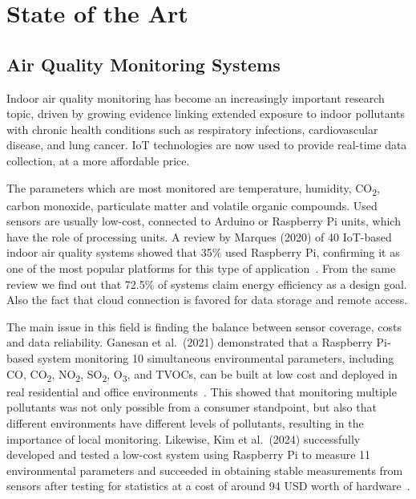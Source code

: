 
\chapter{State of the Art}
\label{ch:sota}

\section{Air Quality Monitoring Systems}
\label{sec:aq-monitoring}

Indoor air quality monitoring has become an increasingly important research topic, driven by
growing evidence linking extended exposure to indoor pollutants with chronic health conditions
such as respiratory infections, cardiovascular disease, and lung cancer. IoT technologies are
now used to provide real-time data collection, at a more affordable price.

The parameters which are most monitored are temperature, humidity, CO\textsubscript{2}, carbon
monoxide, particulate matter and volatile organic compounds. Used sensors are usually low-cost,
connected to Arduino or Raspberry Pi units, which have the role of processing units. A review
by Marques (2020) of 40 IoT-based indoor air quality systems showed that 35\% used
Raspberry Pi, confirming it as one of the most popular platforms for this type of
application~\cite{marques2020}. From the same review we find out that 72.5\% of systems claim
energy efficiency as a design goal. Also the fact that cloud connection is favored for data
storage and remote access.

The main issue in this field is finding the balance between sensor coverage, costs and data
reliability. Ganesan et al.\ (2021) demonstrated that a Raspberry Pi-based system monitoring
10 simultaneous environmental parameters, including CO, CO\textsubscript{2}, NO\textsubscript{2},
SO\textsubscript{2}, O\textsubscript{3}, and TVOCs, can be built at low cost and deployed in
real residential and office environments~\cite{ganesan2021}. This showed that monitoring
multiple pollutants was not only possible from a consumer standpoint, but also that different
environments have different levels of pollutants, resulting in the importance of local
monitoring. Likewise, Kim et al.\ (2024) successfully developed and tested a low-cost system
using Raspberry Pi to measure 11 environmental parameters and succeeded in obtaining stable
measurements from sensors after testing for statistics at a cost of around 94 USD worth of
hardware~\cite{kim2024}.


